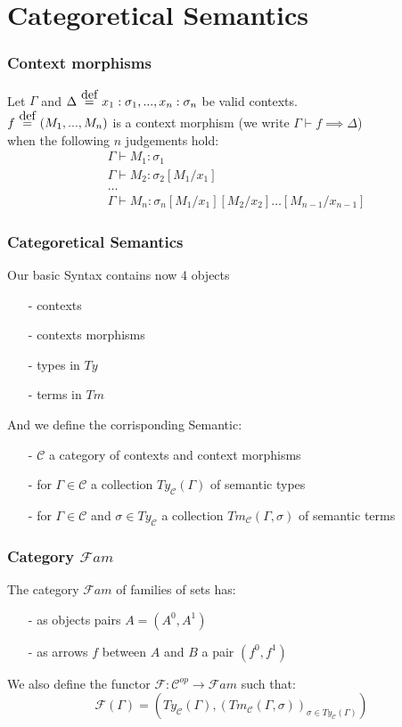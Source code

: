 \documentclass[aspectratio=169]{beamer}
\newcommand\defeq{\stackrel{\mathclap{\normalfont\mbox{def}}}{\ =\ }}
\newcommand{\Gamdash}{\Gamma\vdash}
\newcommand{\Fami}{\mathcal{F}am}
\newcommand{\cate}{\mathcal{C}}
\newcommand{\types}{Ty_{\cate}}
\newcommand{\terms}{Tm_{\cate}}
\begin{document}
    \section{Categoretical Semantics}
    \begin{frame}
        \frametitle{Context morphisms}
        Let $\Gamma$ and $\Delta \defeq x_1:\sigma_1,...,x_n:\sigma_n$ be valid contexts.\\
        $f \defeq (M_1,...,M_n)$ is a context morphism (we write $\Gamdash f \implies \Delta$)\\
        when the following $n$ judgements hold:
        \begin{align*}
            &\Gamdash M_1:\sigma_1\\
            &\Gamdash M_2:\sigma_2[M_1/x_1]\\
            &\dots\\
            &\Gamdash M_n:\sigma_n[M_1/x_1][M_2/x_2]\dots[M_{n-1}/x_{n-1}]
        \end{align*}
    \end{frame}
    \begin{frame}
        \frametitle{Categoretical Semantics}
        Our basic Syntax contains now 4 objects
        \begin{itemize}
            \item[-] contexts
            \item[-] contexts morphisms
            \item[-] types in $Ty$
            \item[-] terms in $Tm$   
        \end{itemize}
        \vspace{10pt}
        And we define the corrisponding Semantic:
        \begin{itemize}
            \item[-] $\cate$ a category of contexts and context morphisms
            \item[-] for $\Gamma\in\cate$ a collection $\types(\Gamma)$ of semantic types
            \item[-] for $\Gamma\in\cate$ and $\sigma\in\types$ a collection $\terms(\Gamma,\sigma)$ of semantic terms
        \end{itemize}
        
    \end{frame}
    \begin{frame}
        \frametitle{Category $\Fami$}
        The category $\Fami$ of families of sets has:
        \begin{itemize}
            \item[-] as objects pairs $A = (A^0,A^1)$
            \item[-] as arrows $f$ between $A$ and $B$ a pair $(f^0,f^1)$
        \end{itemize}
        \vspace{15pt}
        We also define the functor $\mathcal{F}:\cate^{op}\to\Fami$ such that:
        $$\mathcal{F}(\Gamma)=(\types(\Gamma),(\terms(\Gamma,\sigma))_{\sigma\in\types(\Gamma)})$$
    \end{frame}
\end{document}
